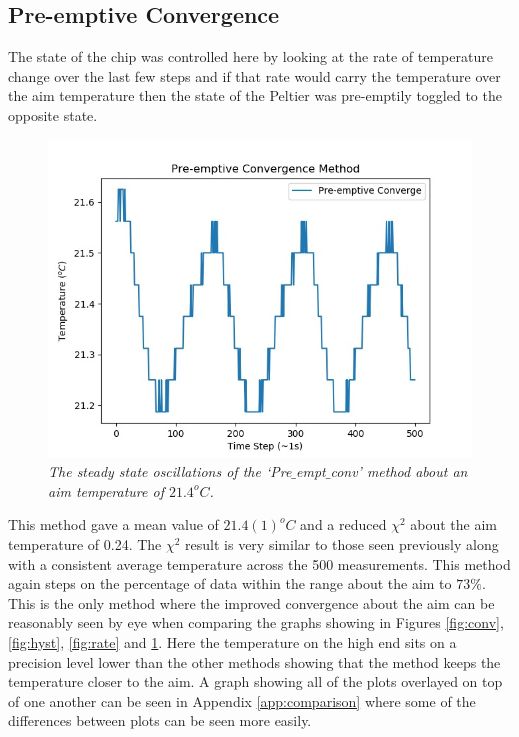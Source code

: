 \documentclass[10pt]{article}
\begin{document}
\subsection*{Pre-emptive Convergence}
The state of the chip was controlled here by looking at the rate of temperature change over the last few steps and if that rate would carry the temperature over the aim temperature then the state of the Peltier was pre-emptily toggled to the opposite state.\\

\begin{figure}[h!]
    \centering
    \includegraphics[scale=0.75]{pre_emp.jpg}
    \caption{\it{The steady state oscillations of the `Pre$\_$empt$\_$conv' method about an aim temperature of $21.4^oC$.}}
    \label{fig:pre}
\end{figure}

This method gave a mean value of $21.4(1)^oC$ and a reduced $\chi^2$ about the aim temperature of 0.24. The $\chi^2$ result is very similar to those seen previously along with a consistent average temperature across the 500 measurements. This method again steps on the percentage of data within the range about the aim to $73\%$. This is the only method where the improved convergence about the aim can be reasonably seen by eye when comparing the graphs showing in Figures \ref{fig:conv}, \ref{fig:hyst}, \ref{fig:rate} and \ref{fig:pre}. Here the temperature on the high end sits on a precision level lower than the other methods showing that the method keeps the temperature closer to the aim. A graph showing all of the plots overlayed on top of one another can be seen in Appendix \ref{app:comparison} where some of the differences between plots can be seen more easily.\\
\end{document}
